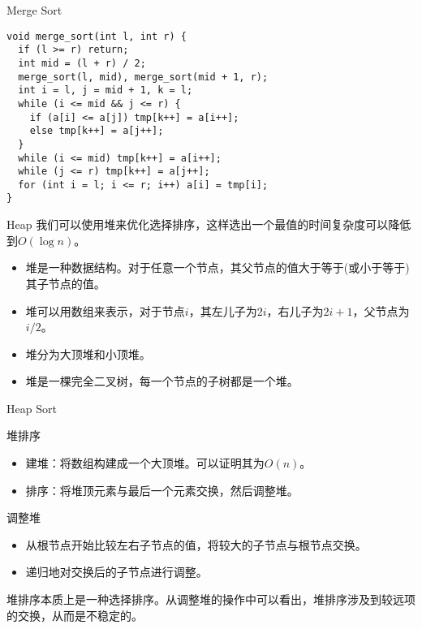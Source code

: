 \documentclass{ldr-simple-gray}
\begin{document}
  \begin{frame}[fragile]{Merge Sort}
    \begin{verbatim}
void merge_sort(int l, int r) {
  if (l >= r) return;
  int mid = (l + r) / 2;
  merge_sort(l, mid), merge_sort(mid + 1, r);
  int i = l, j = mid + 1, k = l;
  while (i <= mid && j <= r) {
    if (a[i] <= a[j]) tmp[k++] = a[i++];
    else tmp[k++] = a[j++];
  }
  while (i <= mid) tmp[k++] = a[i++];
  while (j <= r) tmp[k++] = a[j++];
  for (int i = l; i <= r; i++) a[i] = tmp[i];
}
    \end{verbatim}
  \end{frame}

  \begin{frame}{Heap}
    我们可以使用堆来优化选择排序，这样选出一个最值的时间复杂度可以降低到$O(\log n)$。
    \begin{itemize}
      \item 堆是一种数据结构。对于任意一个节点，其父节点的值大于等于(或小于等于)其子节点的值。
      \item 堆可以用数组来表示，对于节点$i$，其左儿子为$2i$，右儿子为$2i+1$，父节点为$i/2$。
      \item 堆分为大顶堆和小顶堆。
      \item 堆是一棵完全二叉树，每一个节点的子树都是一个堆。
    \end{itemize}
  \end{frame}

  \begin{frame}{Heap Sort}
    \begin{block}{堆排序}
      \begin{itemize}
        \item 建堆：将数组构建成一个大顶堆。可以证明其为$O(n)$。
        \item 排序：将堆顶元素与最后一个元素交换，然后调整堆。
      \end{itemize}
    \end{block}
    \begin{block}{调整堆}
      \begin{itemize}
        \item 从根节点开始比较左右子节点的值，将较大的子节点与根节点交换。
        \item 递归地对交换后的子节点进行调整。
      \end{itemize}
    \end{block}
    堆排序本质上是一种选择排序。从调整堆的操作中可以看出，堆排序涉及到较远项的交换，从而是不稳定的。
  \end{frame}
\end{document}
